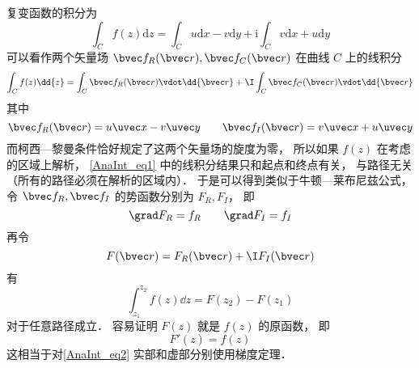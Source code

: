
\begin{issues}
\issueDraft
\end{issues}


复变函数的积分为
\begin{equation}
\int_{C} f(z) \mathrm{d} z=\int_{C} u \mathrm{d} x-v \mathrm{d} y+\mathrm{i} \int_{C} v \mathrm{d} x+u \mathrm{d} y
\end{equation}
可以看作两个矢量场 $\bvec f_R(\bvec r), \bvec f_C(\bvec r)$ 在曲线 $C$ 上的线积分
\begin{equation}\label{AnaInt_eq1}
\int_{C} f(z) \dd{z} = \int_C \bvec f_R(\bvec r) \vdot \dd{\bvec r} + \I \int_C \bvec f_C(\bvec r) \vdot \dd{\bvec r}
\end{equation}
其中
\begin{equation}
\bvec f_R(\bvec r) = u\uvec x - v\uvec y
\qquad
\bvec f_I(\bvec r) = v\uvec x + u\uvec y
\end{equation}
而柯西—黎曼条件恰好规定了这两个矢量场的旋度为零， 所以如果 $f(z)$ 在考虑的区域上解析， \autoref{AnaInt_eq1} 中的线积分结果只和起点和终点有关， 与路径无关（所有的路径必须在解析的区域内）． 于是可以得到类似于牛顿—莱布尼兹公式， 令 $\bvec f_R, \bvec f_I$ 的势函数分别为 $F_R, F_I$， 即
\begin{equation}
\grad F_R = f_R
\qquad
\grad F_I = f_I
\end{equation}
再令
\begin{equation}
F(\bvec r) = F_R(\bvec r) + \I F_I(\bvec r)
\end{equation}
有
\begin{equation}\label{AnaInt_eq2}
\int_{z_1}^{z_2} f(z) \dd{z} = F(z_2) - F(z_1)
\end{equation}
对于任意路径成立． 容易证明 $F(z)$ 就是 $f(z)$ 的原函数， 即
\begin{equation}
F'(z) = f(z)
\end{equation}
这相当于对\autoref{AnaInt_eq2} 实部和虚部分别使用梯度定理．
